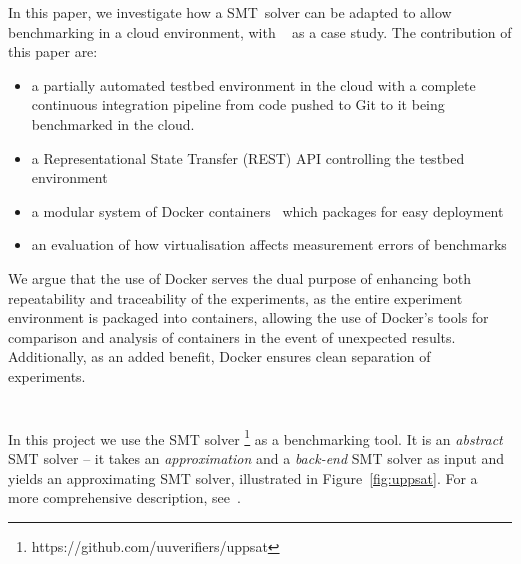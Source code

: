 \documentclass{article}
\begin{document}
\begin{multicols}{2}

In this paper, we investigate how a SMT~solver can be adapted to allow
benchmarking in a cloud environment, with \uppsat~\cite{uppsat} as a
case study. The contribution of this paper are:

\begin{itemize}
  \item a partially automated testbed environment in the cloud with a
    complete continuous integration pipeline from code pushed to Git
    to it being benchmarked in the cloud.
    
  \item a Representational State Transfer (REST) API controlling the
    testbed environment
    
  \item a modular system of Docker containers~\cite{docker} which
    packages \uppsat for easy deployment

  \item an evaluation of how virtualisation affects measurement errors
    of benchmarks
\end{itemize}

We argue that the use of Docker serves the dual purpose of enhancing both
repeatability and traceability of the experiments, as the entire experiment
environment is packaged into containers, allowing the use of Docker's tools for
comparison and analysis of containers in the event of unexpected results.
Additionally, as an added benefit, Docker ensures clean separation of
experiments.


\section{\uppsat}
In this project we use the \uppsat SMT
solver \footnote{https://github.com/uuverifiers/uppsat} as a
benchmarking tool. It is an \emph{abstract} SMT solver -- it takes an
\emph{approximation} and a \emph{back-end} SMT solver as input and
yields an approximating SMT solver, illustrated in
Figure~\ref{fig:uppsat}. For a more comprehensive description,
see~\cite{uppsat}.

\begin{Figure}
\centering
{}
\end{Figure}
\end{multicols}
\end{document}
